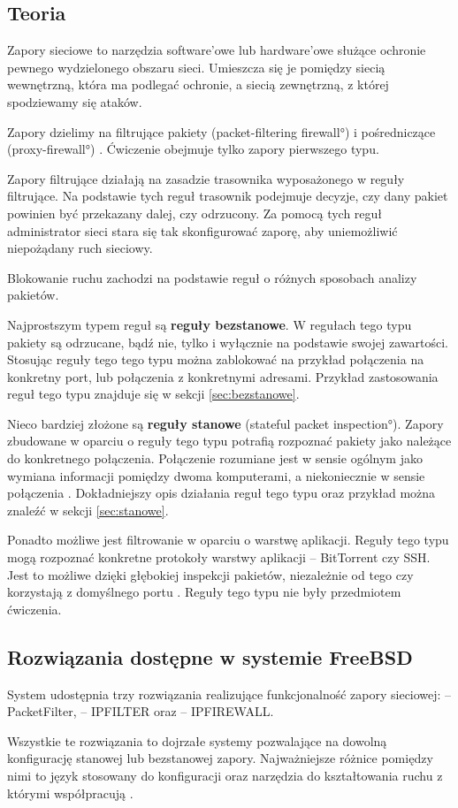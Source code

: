 \subsection{Teoria}

Zapory sieciowe to narzędzia software'owe lub hardware'owe służące ochronie
pewnego wydzielonego obszaru sieci. Umieszcza się je pomiędzy siecią wewnętrzną,
która ma podlegać ochronie, a siecią zewnętrzną, z której spodziewamy się ataków.

Zapory dzielimy na filtrujące pakiety (\ang{packet-filtering firewall}) i
pośredniczące (\ang{proxy-firewall}) \cite{wstep:stevens}. Ćwiczenie obejmuje
tylko zapory pierwszego typu.

Zapory filtrujące działają na zasadzie trasownika wyposażonego w reguły
filtrujące. Na podstawie tych reguł trasownik podejmuje decyzje, czy dany pakiet
powinien być przekazany dalej, czy odrzucony. Za pomocą tych reguł administrator
sieci stara się tak skonfigurować zaporę, aby uniemożliwić niepożądany ruch
sieciowy.

Blokowanie ruchu zachodzi na podstawie reguł o różnych sposobach analizy
pakietów.

Najprostszym typem reguł są \textbf{reguły bezstanowe}. W regułach tego typu
pakiety są odrzucane, bądź nie, tylko i wyłącznie na podstawie swojej
zawartości. Stosując reguły tego tego typu można zablokować na przykład
połączenia na konkretny port, lub połączenia z konkretnymi adresami. Przykład
zastosowania reguł tego typu znajduje się w sekcji \ref{sec:bezstanowe}.

Nieco bardziej złożone są \textbf{reguły stanowe} (\ang{stateful packet
inspection}). Zapory zbudowane w oparciu o reguły tego typu potrafią rozpoznać
pakiety jako należące do konkretnego połączenia. Połączenie rozumiane jest w
sensie ogólnym jako wymiana informacji pomiędzy dwoma komputerami, a
niekoniecznie w sensie połączenia \tcp. Dokładniejszy opis działania reguł tego
typu oraz przykład można znaleźć w sekcji \ref{sec:stanowe}.

Ponadto możliwe jest filtrowanie w oparciu o warstwę aplikacji. Reguły tego typu
mogą rozpoznać konkretne protokoły warstwy aplikacji -- BitTorrent czy SSH. Jest
to możliwe dzięki głębokiej inspekcji pakietów, niezależnie od tego czy
korzystają z domyślnego portu \cite{wstep:stevens}. Reguły tego typu nie były
przedmiotem ćwiczenia.


\subsection{Rozwiązania dostępne w systemie FreeBSD}

System \bsd{} udostępnia trzy rozwiązania realizujące funkcjonalność zapory
sieciowej: \pf{} -- PacketFilter, \ipf{} -- IPFILTER oraz \ipfw{} -- IPFIREWALL.

Wszystkie te rozwiązania to dojrzałe systemy pozwalające na dowolną konfigurację
stanowej lub bezstanowej zapory. Najważniejsze różnice pomiędzy nimi to język
stosowany do konfiguracji oraz narzędzia do kształtowania ruchu z którymi
współpracują \cite{bsd:firewall}.
